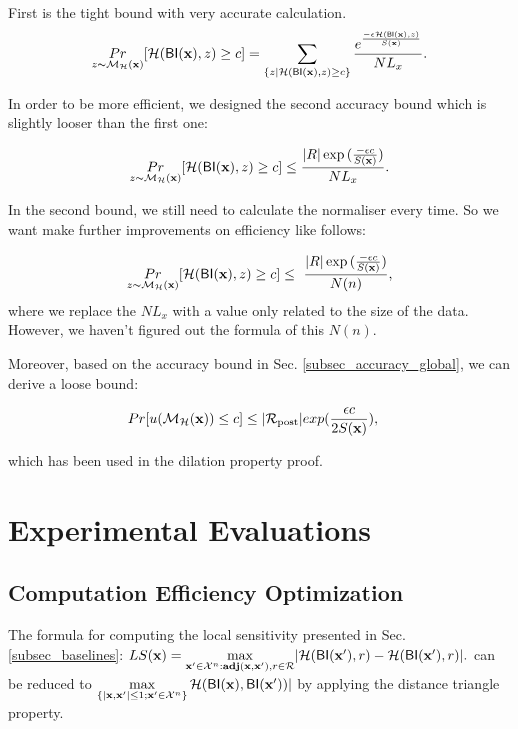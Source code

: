 \documentclass{article}
\begin{document}
First is the tight bound with very accurate calculation.
\begin{equation*}
\underset{z \thicksim \mathcal{M}_{\mathcal{H}}(\textbf{x})}{Pr}[ \mathcal{H}(\mathsf{BI}(\textbf{x}), z) \geq c] = \sum\limits_{\{z | \mathcal{H}(\mathsf{BI}(\textbf{x}), z) \geq c\}} \frac{e^{\frac{- \epsilon \mathcal{H}(\mathsf{BI}(\textbf{x}), z)}{S(\textbf{x})}}}{NL_x}.
\end{equation*}

In order to be more efficient, we designed the second accuracy bound which is slightly looser than the first one:

\begin{equation*}
\underset{z \thicksim \mathcal{M}_{\mathcal{H}}(\textbf{x})}{Pr}[ \mathcal{H}(\mathsf{BI}(\textbf{x}), z) \geq c] \leq \frac{|R| \exp{(\frac{- \epsilon c}{S(\textbf{x})}})}{NL_x}.
\end{equation*}

In the second bound, we still need to calculate the normaliser every time. So we want make further improvements on efficiency like follows:

\begin{equation*}
\underset{z \thicksim \mathcal{M}_{\mathcal{H}}(\textbf{x})}{Pr}[ \mathcal{H}(\mathsf{BI}(\textbf{x}), z) \geq c] \leq \ \frac{|R| \exp{(\frac{- \epsilon c}{S(\textbf{x})}})}{N(n)},
\end{equation*}
where we replace the $NL_x$ with a value only related to the size of the data. However, we haven't figured out the formula of this $N(n)$.

Moreover, based on the accuracy bound in Sec. \ref{subsec_accuracy_global}, we can derive a loose bound:

\begin{equation*}
\begin{split}
Pr[u(\mathcal{M}_{\mathcal{H}}(\textbf{x})) \leq c] 
& \leq |\mathcal{R}_{\textup{post}}|exp(\frac{\epsilon c}{2 S(\textbf{x})}),
\end{split}
\end{equation*}

which has been used in the dilation property proof.



\section{Experimental Evaluations}
\label{sec_experiment}

\subsection{Computation Efficiency Optimization}
\label{subsec_effi}
The formula for computing the local sensitivity presented in Sec. \ref{subsec_baselines}: $LS(\textbf{x})=\max\limits_{\textbf{x}' \in \mathcal{X}^n:\textbf{adj}(\textbf{x},\textbf{x}'), r\in \mathcal{R}}\lvert \mathcal{H}(\mathsf{BI}(\textbf{x}'), r) - \mathcal{H}(\mathsf{BI}(\textbf{x}'), r)\rvert.$ 
can be reduced to $\max\limits_{\{|\textbf{x},\textbf{x}'| \leq 1; \textbf{x}'\in \mathcal{X}^n\}}\mathcal{H}(\mathsf{BI}(\textbf{x}), \mathsf{BI}(\textbf{x}'))|$
by applying the distance triangle property. 
\end{document}

